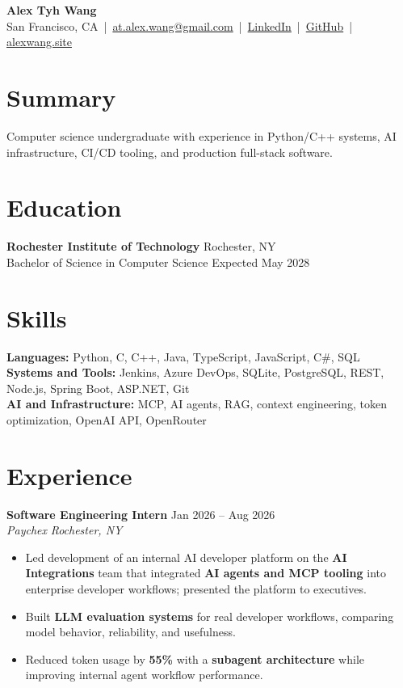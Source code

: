 \documentclass[10pt,letterpaper]{article}
\newif\ifresumeFirstRole
\newcommand{\resumeRole}[4]{%
  \ifresumeFirstRole
    \global\resumeFirstRolefalse
  \else
    \vspace{0pt plus 1fill}%
  \fi
  \textbf{#1} \hfill #2\\
  \textit{#3} \hfill \textit{#4}
}
\begin{document}
\begin{center}
{\Large \textbf{Alex Tyh Wang}}\\
San Francisco, CA \,|\, \href{mailto:at.alex.wang@gmail.com}{at.alex.wang@gmail.com} \,|\, \href{https://www.linkedin.com/in/alex-tyh-wang/}{LinkedIn} \,|\, \href{https://github.com/alextyhwang}{GitHub} \,|\, \href{https://alexwang.site}{alexwang.site}
\end{center}

\section*{Summary}
Computer science undergraduate with experience in Python/C++ systems, AI infrastructure, CI/CD tooling, and production full-stack software.

\section*{Education}
\textbf{Rochester Institute of Technology} \hfill Rochester, NY\\
Bachelor of Science in Computer Science \hfill Expected May 2028

\section*{Skills}
\textbf{Languages:} Python, C, C++, Java, TypeScript, JavaScript, C\#, SQL\\
\textbf{Systems and Tools:} Jenkins, Azure DevOps, SQLite, PostgreSQL, REST, Node.js, Spring Boot, ASP.NET, Git\\
\textbf{AI and Infrastructure:} MCP, AI agents, RAG, context engineering, token optimization, OpenAI API, OpenRouter

\section*{Experience}
\resumeRole{Software Engineering Intern}{Jan 2026 -- Aug 2026}{Paychex}{Rochester, NY}
\begin{itemize}
  \item Led development of an internal AI developer platform on the \textbf{AI Integrations} team that integrated \textbf{AI agents and MCP tooling} into enterprise developer workflows; presented the platform to executives.
  \item Built \textbf{LLM evaluation systems} for real developer workflows, comparing model behavior, reliability, and usefulness.
  \item Reduced token usage by \textbf{55\%} with a \textbf{subagent architecture} while improving internal agent workflow performance.
\end{itemize}
\end{document}
